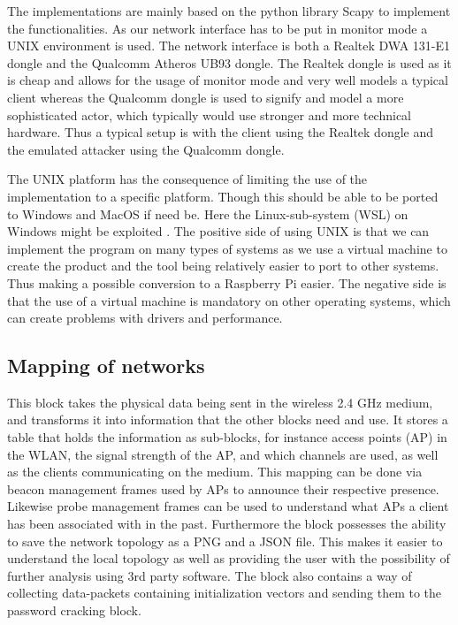 The implementations are mainly based on the python library Scapy \cite{scapy} to implement the functionalities. As our network interface has to be put in monitor mode a UNIX environment is used. 
The network interface is both a Realtek DWA 131-E1 dongle and the Qualcomm Atheros UB93 dongle. The Realtek dongle is used as it is cheap and allows for the usage of monitor mode and very well models a typical client whereas the Qualcomm dongle is used to signify and model a more sophisticated actor, which typically would use stronger and more technical hardware. Thus a typical setup is with the client using the Realtek dongle and the emulated attacker using the Qualcomm dongle.

The UNIX platform has the consequence of limiting the use of the implementation to a specific platform. Though this should be able to be ported to Windows and MacOS if need be. Here the Linux-sub-system (WSL) on Windows might be exploited \cite{WSL_exploit}.
The positive side of using UNIX is that we can implement the program on many types of systems as we use a virtual machine to create the product and the tool being relatively easier to port to other systems. Thus making a possible conversion to a Raspberry Pi easier. The negative side is that the use of a virtual machine is mandatory on other operating systems, which can create problems with drivers and performance. 

\subsection{Mapping of networks}
This block takes the physical data being sent in the wireless 2.4 GHz medium, and transforms it into information that the other blocks need and use. It stores a table that holds the information as sub-blocks, for instance access points (AP) in the WLAN, the signal strength of the AP, and which channels are used, as well as the clients communicating on the medium. This mapping can be done via beacon management frames used by APs to announce their respective presence. Likewise probe management frames can be used to understand what APs a client has been associated with in the past.
Furthermore the block possesses the ability to save the network topology as a PNG and a JSON file. This makes it easier to understand the local topology as well as providing the user with the possibility of further analysis using 3rd party software.
The block also contains a way of collecting data-packets containing initialization vectors and sending them to the password cracking block. 

